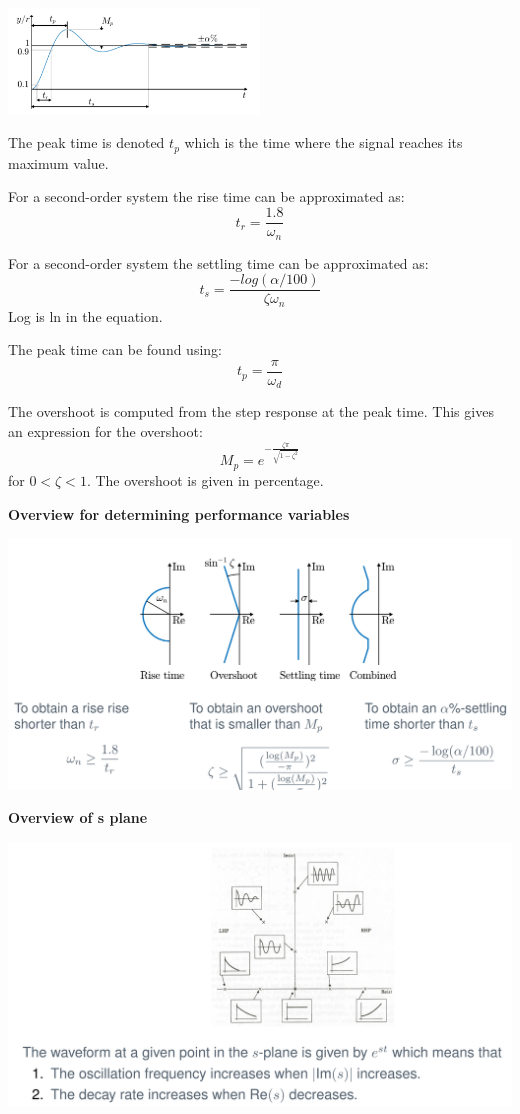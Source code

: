 \begin{center}
	\includegraphics[width=0.5\textwidth]{Images/performance.png}
\end{center}

The peak time is denoted $t_p$ which is the time where the signal reaches its maximum value.

For a second-order system the rise time can be approximated as:
$$t_r = \frac{1.8}{\omega_n}$$

For a second-order system the settling time can be approximated as:
$$t_s = \frac{-log(\alpha/100)}{\zeta \omega_n}$$
Log is ln in the equation.

The peak time can be found using:
$$t_p = \frac{\pi}{\omega_d}$$

The overshoot is computed from the step response at the peak time. This gives
an expression for the overshoot:
$$M_p = e^{-\frac{\zeta \pi}{\sqrt{1-\zeta^2}}}$$
for $0<\zeta<1$. The overshoot is given in percentage.


\textbf{Overview for determining performance variables}
\begin{center}
	\includegraphics[width=\textwidth]{Images/perfSpec.png}
\end{center}



\textbf{Overview of s plane}

\begin{center}
	\includegraphics[width=\textwidth]{Images/s-plane.png}
\end{center}



